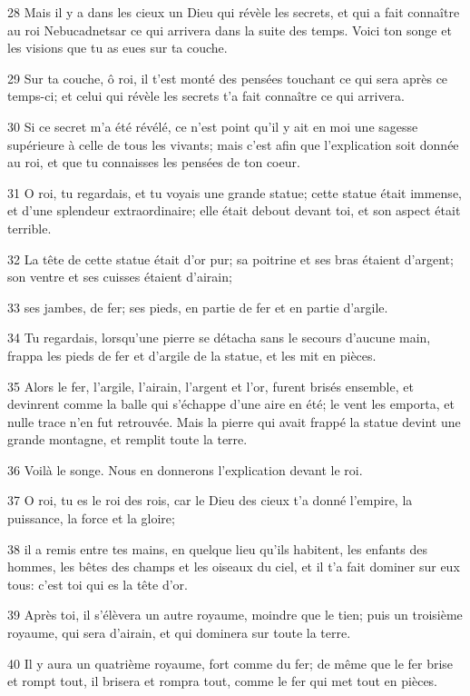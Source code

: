 \par 28 Mais il y a dans les cieux un Dieu qui révèle les secrets, et qui a fait connaître au roi Nebucadnetsar ce qui arrivera dans la suite des temps. Voici ton songe et les visions que tu as eues sur ta couche.
\par 29 Sur ta couche, ô roi, il t'est monté des pensées touchant ce qui sera après ce temps-ci; et celui qui révèle les secrets t'a fait connaître ce qui arrivera.
\par 30 Si ce secret m'a été révélé, ce n'est point qu'il y ait en moi une sagesse supérieure à celle de tous les vivants; mais c'est afin que l'explication soit donnée au roi, et que tu connaisses les pensées de ton coeur.
\par 31 O roi, tu regardais, et tu voyais une grande statue; cette statue était immense, et d'une splendeur extraordinaire; elle était debout devant toi, et son aspect était terrible.
\par 32 La tête de cette statue était d'or pur; sa poitrine et ses bras étaient d'argent; son ventre et ses cuisses étaient d'airain;
\par 33 ses jambes, de fer; ses pieds, en partie de fer et en partie d'argile.
\par 34 Tu regardais, lorsqu'une pierre se détacha sans le secours d'aucune main, frappa les pieds de fer et d'argile de la statue, et les mit en pièces.
\par 35 Alors le fer, l'argile, l'airain, l'argent et l'or, furent brisés ensemble, et devinrent comme la balle qui s'échappe d'une aire en été; le vent les emporta, et nulle trace n'en fut retrouvée. Mais la pierre qui avait frappé la statue devint une grande montagne, et remplit toute la terre.
\par 36 Voilà le songe. Nous en donnerons l'explication devant le roi.
\par 37 O roi, tu es le roi des rois, car le Dieu des cieux t'a donné l'empire, la puissance, la force et la gloire;
\par 38 il a remis entre tes mains, en quelque lieu qu'ils habitent, les enfants des hommes, les bêtes des champs et les oiseaux du ciel, et il t'a fait dominer sur eux tous: c'est toi qui es la tête d'or.
\par 39 Après toi, il s'élèvera un autre royaume, moindre que le tien; puis un troisième royaume, qui sera d'airain, et qui dominera sur toute la terre.
\par 40 Il y aura un quatrième royaume, fort comme du fer; de même que le fer brise et rompt tout, il brisera et rompra tout, comme le fer qui met tout en pièces.
